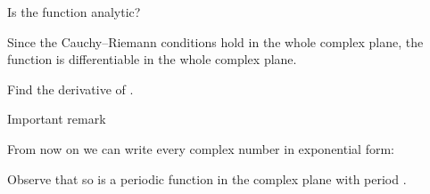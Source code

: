 \begin{EMexample}{}

Is the function  analytic?

Since the Cauchy--Riemann conditions hold in the whole complex plane, the function  is differentiable in the whole complex plane.

\end{EMexample}

\begin{EMexample}{}

Find the derivative of .


\end{EMexample}

\begin{EMimportant}{Important remark}

From now on we can write every complex number in exponential form:

\end{EMimportant}

\begin{EMunit}

Observe that
so  is a periodic function in the complex plane with period .


\end{EMunit}

\EMhold


\begin{EMunit}


\end{EMunit}

